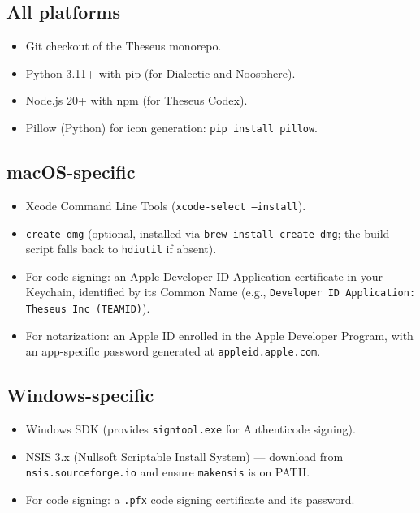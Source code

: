 \documentclass[11pt,letterpaper]{article}
\newcommand{\file}[1]{\texttt{#1}}
\newcommand{\cmd}[1]{\texttt{#1}}
\begin{document}
\subsection{All platforms}

\begin{itemize}[leftmargin=1.5em,itemsep=0.2em]
  \item Git checkout of the Theseus monorepo.
  \item Python 3.11+ with pip (for Dialectic and Noosphere).
  \item Node.js 20+ with npm (for Theseus Codex).
  \item Pillow (Python) for icon generation: \cmd{pip install pillow}.
\end{itemize}

\subsection{macOS-specific}

\begin{itemize}[leftmargin=1.5em,itemsep=0.2em]
  \item Xcode Command Line Tools (\cmd{xcode-select --install}).
  \item \cmd{create-dmg} (optional, installed via \cmd{brew install create-dmg}; the build script falls back to \cmd{hdiutil} if absent).
  \item For code signing: an Apple Developer ID Application certificate in your Keychain, identified by its Common Name (e.g., \cmd{Developer ID Application: Theseus Inc (TEAMID)}).
  \item For notarization: an Apple ID enrolled in the Apple Developer Program, with an app-specific password generated at \cmd{appleid.apple.com}.
\end{itemize}

\subsection{Windows-specific}

\begin{itemize}[leftmargin=1.5em,itemsep=0.2em]
  \item Windows SDK (provides \cmd{signtool.exe} for Authenticode signing).
  \item NSIS 3.x (Nullsoft Scriptable Install System) --- download from \cmd{nsis.sourceforge.io} and ensure \cmd{makensis} is on PATH.
  \item For code signing: a \file{.pfx} code signing certificate and its password.
\end{itemize}
\end{document}
